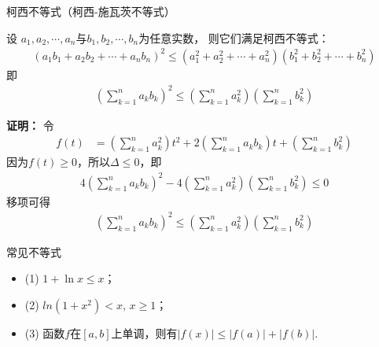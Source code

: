 \documentclass{article}
\begin{document}
\begin{zremark}
    柯西不等式（柯西-施瓦茨不等式）

    设
    $a_1, a_2, \cdots, a_n$与$b_1, b_2, \cdots, b_n$为任意实数，
    则它们满足柯西不等式：
    \begin{align*}
        (a_1b_1 + a_2b_2 + \cdots + a_nb_n)^2
        \leq (a_1^2 + a_2^2 + \cdots + a_n^2)(b_1^2 + b_2^2 + \cdots + b_n^2)
    \end{align*}
    即
    \begin{align*}
        \left(\sum\limits_{k = 1}^n a_k b_k\right)^2
        \leq \left(\sum\limits_{k = 1}^n a_k^2 \right) \left(\sum\limits_{k = 1}^n b_k^2 \right)
    \end{align*}
\end{zremark}
\textbf{证明：}
令
\begin{align*}
    f(t) & = \left(\sum\limits_{k = 1}^n a_k^2 \right) t^2 + 2\left(\sum\limits_{k = 1}^n a_k b_k\right) t + \left(\sum\limits_{k = 1}^n b_k^2 \right)
\end{align*}
因为$f(t) \geq 0$，所以$\Delta \leq 0$，即
\begin{align*}
    4 \left(\sum\limits_{k = 1}^n a_k b_k\right)^2 - 4 \left(\sum\limits_{k = 1}^n a_k^2 \right) \left(\sum\limits_{k = 1}^n b_k^2 \right) \leq 0
\end{align*}
移项可得
\begin{align*}
    \left(\sum\limits_{k = 1}^n a_k b_k\right)^2
    \leq \left(\sum\limits_{k = 1}^n a_k^2 \right) \left(\sum\limits_{k = 1}^n b_k^2 \right)
\end{align*}


\begin{zremark}
    常见不等式
    \begin{itemize}
        \item (1) $1 + \ln x \leq x$；

        \item (2) $ln(1 + x^2) < x, \, x \geq 1$；

        \item (3) 函数$f$在$[a,b]$上单调，则有$|f(x)| \leq |f(a)| + |f(b)|$.


    \end{itemize}

\end{zremark}
\end{document}

